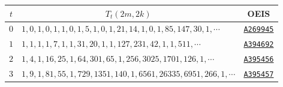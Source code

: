 \begin{table}[h]
  \centering
  \begin{tabular}{|c|l |c|}
    \hline
    \multicolumn{1}{|c|}{$t$} &
    \multicolumn{1}{c|}{$T_t(2m,2k)$} &
    \multicolumn{1}{c|}{OEIS} \\
    \hline

    $0$ &
    $1, 0, 1, 0, 1, 1, 0, 1, 5, 1, 0, 1, 21, 14, 1, 0, 1, 85, 147, 30, 1, \cdots $
    & \href{https://oeis.org/A269945}{\texttt{A269945}} \\

    $1$ &
    $1, 1, 1, 1, 7, 1, 1, 31, 20, 1, 1, 127, 231, 42, 1, 1, 511,\cdots$
    & \href{https://oeis.org/A394692}{\texttt{A394692}} \\

    $2$ &
    $1,4,1,16,25,1,64,301,65,1,256,3025,1701,126,1, \cdots$
    & \href{https://oeis.org/A395456}{\texttt{A395456}} \\

    $3$ &
    $1, 9, 1, 81, 55, 1, 729, 1351, 140, 1, 6561, 26335, 6951, 266, 1, \cdots$
    & \href{https://oeis.org/A395457}{\texttt{A395457}} \\

    \hline
  \end{tabular}
\end{table}
